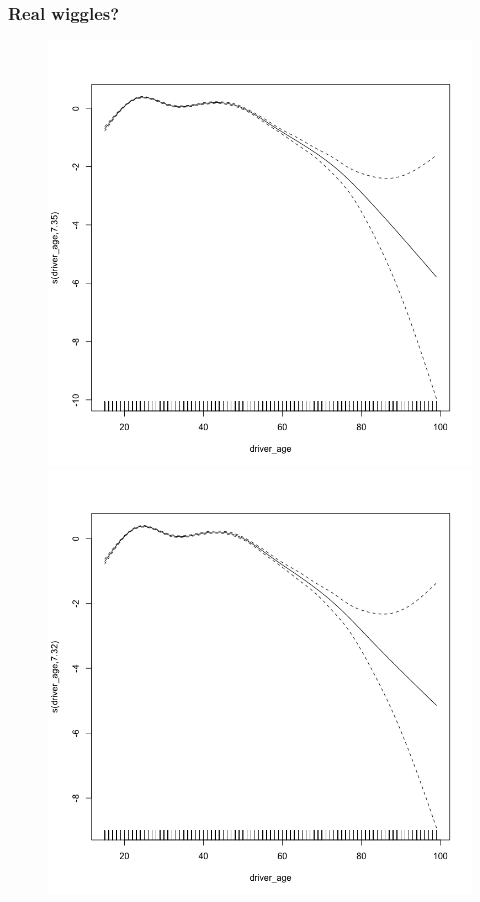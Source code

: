 \documentclass{beamer}
\begin{document}
\begin{frame}
\frametitle{Real wiggles?}

\begin{figure}
\includegraphics[scale=.13]{figures/og1}
\includegraphics[scale=.13]{figures/shrinkage1}


\end{figure}
\end{frame}
\end{document}
